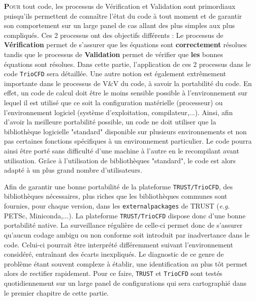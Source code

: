
\lettrine[lines=2,slope=0pt,nindent=4pt]{\textbf{P}}{our} tout code, les processus de V\'erification et Validation sont primordiaux puisqu'ils permettent de conna\^itre l'\'etat du code \`a tout moment et de garantir son comportement sur un large panel de cas allant des plus simples aux plus compliqu\'es. Ces 2 processus ont des objectifs diff\'erents : Le processus de \textbf{V\'erification} permet de s'assurer que les \'equations sont \textbf{correctement} r\'esolues tandis que le processus de \textbf{Validation} permet de v\'erifier que \textbf{les} bonnes \'equations sont r\'esolues.\newline
Dans cette partie, l'application de ces 2 processus dans le code \texttt{TrioCFD} sera d\'etaill\'ee.\smallskip\newline
Une autre notion est \'egalement extrêmement importante dans le processus de V\&V du code, \`a savoir la portabilit\'e du code. En effet, un code de calcul doit \^etre le moins sensible possible \`a l'environnement sur lequel il est utilis\'e que ce soit la configuration mat\'erielle (processeur) ou l'environnement logiciel (syst\`eme d'exploitation, compilateur,...). Ainsi, afin d'avoir la meilleure portabilit\'e possible, un code ne doit utiliser que la biblioth\`eque logicielle "standard" disponible sur plusieurs environnements et non pas certaines fonctions sp\'ecifiques \`a un environnement particulier. Le code pourra ainsi \^etre port\'e sans difficult\'e d'une machine à l'autre en le recompilant avant utilisation. Gr\^ace \`a l'utilisation de biblioth\`eques "standard", le code est alors adapt\'e \`a un plus grand nombre d'utilisateurs.\newline

Afin de garantir une bonne portabilit\'e de la plateforme \texttt{TRUST/TrioCFD}, des biblioth\`eques n\'ecessaires, plus riches que les biblioth\`eques communes sont fournies, pour chaque version, dans les \texttt{externalpackages} de TRUST (\textit{e.g.} PETSc, Miniconda,...). La plateforme \texttt{TRUST/TrioCFD} dispose donc d'une bonne portabilit\'e native. La surveillance r\'eguli\`ere de celle-ci permet donc de s'assurer qu'aucun codage ambigu ou non conforme soit introduit par inadvertance dans le code. Celui-ci pourrait \^etre interprété diff\'eremment suivant l'environnement consid\'er\'e, entra\^inant des \'ecarts inexpliqu\'es. Le diagnostic de ce genre de probl\`eme \'etant souvent complexe \`a \'etablir, une identification au plus t\^ot permet alors de rectifier rapidement. Pour ce faire, \texttt{TRUST} et \texttt{TrioCFD} sont test\'es quotidiennement sur un large panel de configurations qui sera cartographi\'e dans le premier chapitre de cette partie.


